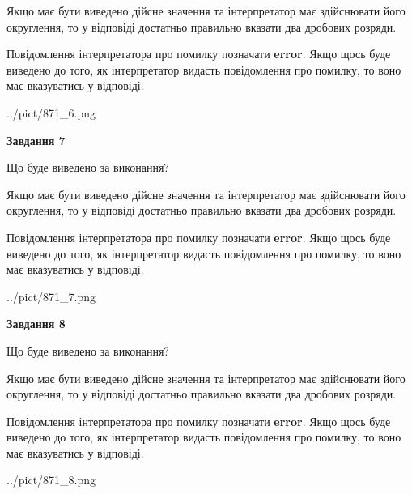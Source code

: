 \documentclass[12pt, ukrainian]{article}
\begin{document}
{\begin {Large}
Якщо має бути виведено дійсне значення та інтерпретатор має здійснювати його округлення, 
то у відповіді достатньо правильно вказати два дробових розряди.

Повідомлення інтерпретатора про помилку позначати \textbf{error}.
Якщо щось буде виведено до того, як інтерпретатор видасть повідомлення про помилку, 
то воно має вказуватись у відповіді. \par

\begin{center}
	{../pict/871_6.png}
\end{center}
\newpage

{\begin {center}\textbf{Завдання 7}\end {center}}\par
Що буде виведено за виконання? \par

Якщо має бути виведено дійсне значення та інтерпретатор має здійснювати його округлення, 
то у відповіді достатньо правильно вказати два дробових розряди.

Повідомлення інтерпретатора про помилку позначати \textbf{error}.
Якщо щось буде виведено до того, як інтерпретатор видасть повідомлення про помилку, 
то воно має вказуватись у відповіді. \par

\begin{center}
	{../pict/871_7.png}
\end{center}
\newpage

{\begin {center}\textbf{Завдання 8}\end {center}}\par
Що буде виведено за виконання? \par

Якщо має бути виведено дійсне значення та інтерпретатор має здійснювати його округлення, 
то у відповіді достатньо правильно вказати два дробових розряди.

Повідомлення інтерпретатора про помилку позначати \textbf{error}.
Якщо щось буде виведено до того, як інтерпретатор видасть повідомлення про помилку, 
то воно має вказуватись у відповіді. \par

\begin{center}
	{../pict/871_8.png}
\end{center}
\newpage


\end{Large}}
\end{document}
